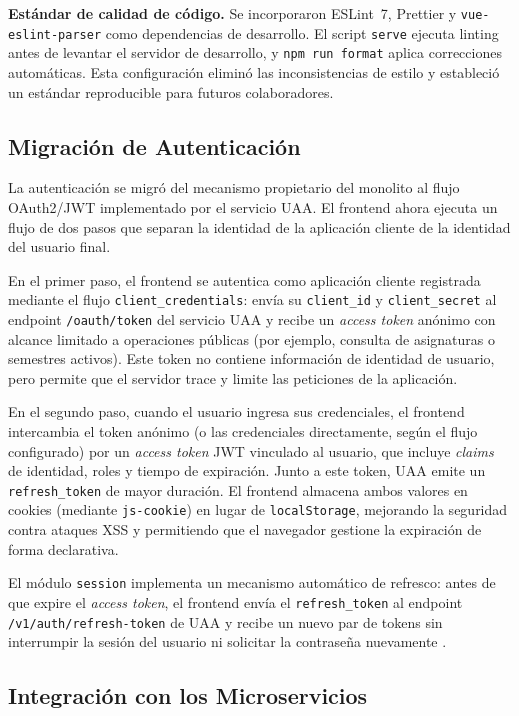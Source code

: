 \textbf{Estándar de calidad de código.} Se incorporaron ESLint~7, Prettier y
\texttt{vue-eslint-parser} como dependencias de desarrollo. El script \texttt{serve}
ejecuta linting antes de levantar el servidor de desarrollo, y \texttt{npm run format}
aplica correcciones automáticas. Esta configuración eliminó las inconsistencias
de estilo y estableció un estándar reproducible para futuros colaboradores.

\subsection{Migración de Autenticación}

La autenticación se migró del mecanismo propietario del monolito al flujo
OAuth2/JWT implementado por el servicio UAA. El frontend ahora ejecuta un flujo de
dos pasos que separan la identidad de la aplicación cliente de la identidad del
usuario final.

En el primer paso, el frontend se autentica como aplicación cliente registrada
mediante el flujo \texttt{client\_credentials}: envía su \texttt{client\_id} y
\texttt{client\_secret} al endpoint \texttt{/oauth/token} del servicio UAA y recibe
un \textit{access token} anónimo con alcance limitado a operaciones públicas (por
ejemplo, consulta de asignaturas o semestres activos). Este token no contiene
información de identidad de usuario, pero permite que el servidor trace y limite
las peticiones de la aplicación.

En el segundo paso, cuando el usuario ingresa sus credenciales, el frontend
intercambia el token anónimo (o las credenciales directamente, según el flujo
configurado) por un \textit{access token} JWT vinculado al usuario, que incluye
\textit{claims} de identidad, roles y tiempo de expiración. Junto a este token, UAA
emite un \texttt{refresh\_token} de mayor duración. El frontend almacena ambos
valores en cookies (mediante \texttt{js-cookie}) en lugar de \texttt{localStorage},
mejorando la seguridad contra ataques XSS y permitiendo que el navegador gestione
la expiración de forma declarativa.

El módulo \texttt{session} implementa un mecanismo automático de refresco:
antes de que expire el \textit{access token}, el frontend envía el
\texttt{refresh\_token} al endpoint \texttt{/v1/auth/refresh-token} de UAA y recibe
un nuevo par de tokens sin interrumpir la sesión del usuario ni solicitar la
contraseña nuevamente \cite{rfc6749,rfc7519}.

\subsection{Integración con los Microservicios}

